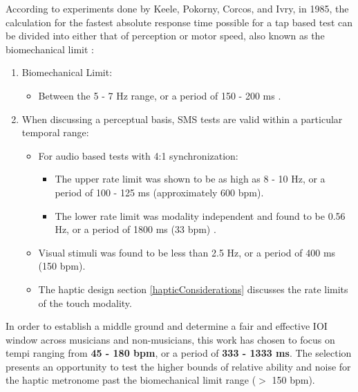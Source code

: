 According to experiments done by Keele, Pokorny, Corcos, and Ivry, in 1985, the calculation for the fastest absolute response time possible for a tap based test can be divided into either that of perception or motor speed, also known as the biomechanical limit \cite{keele1985perception}:
\begin{enumerate}
    \item Biomechanical Limit:
    \begin{itemize}
        \item Between the 5 - 7 Hz range, or a period of 150 - 200 ms \cite{repp2006rate}.
    \end{itemize}
    \item When discussing a perceptual basis, SMS tests are valid within a particular temporal range:
    \begin{itemize}
        \item For audio based tests with 4:1 synchronization:
        \begin{itemize}
            \item The upper rate limit was shown to be as high as 8 - 10 Hz, or a period of 100 - 125 ms (approximately 600 bpm). 
            \item The lower rate limit was modality independent and found to be 0.56 Hz, or a period of 1800 ms (33 bpm) \cite{repp2006rate}. 
        \end{itemize}
        \item Visual stimuli was found to be less than 2.5 Hz, or a period of 400 ms (150 bpm). 
        \item The haptic design section \ref{hapticConsiderations} discusses the rate limits of the touch modality.
    \end{itemize}
\end{enumerate}

In order to establish a middle ground and determine a fair and effective IOI window across musicians and non-musicians, this work has chosen to focus on tempi ranging from \textbf{45 - 180 bpm}, or a period of \textbf{333 - 1333 ms}. The selection presents an opportunity to test the higher bounds of relative ability and noise for the haptic metronome past the biomechanical limit range ($>$ 150 bpm).